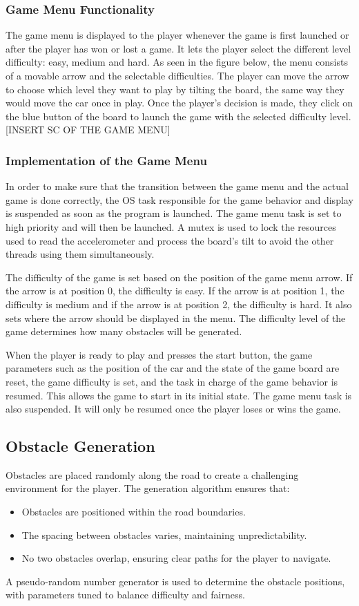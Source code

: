 \documentclass[conference]{IEEEtran}
\begin{document}
\subsubsection{Game Menu Functionality}
The game menu is displayed to the player whenever the game is first launched or after the player has won or lost a game. It lets the player select the different level difficulty: easy, medium and hard. As seen in the figure below, the menu consists of a movable arrow and the selectable difficulties. The player can move the arrow to choose which level they want to play by tilting the board, the same way they would move the car once in play. Once the player's decision is made, they click on the blue button of the board to launch the game with the selected difficulty level. 
[INSERT SC OF THE GAME MENU]

\subsubsection{Implementation of the Game Menu}
In order to make sure that the transition between the game menu and the actual game is done correctly, the OS task responsible for the game behavior and display is suspended as soon as the program is launched. The game menu task is set to high priority and will then be launched. A mutex is used to lock the resources used to read the accelerometer and process the board's tilt to avoid the other threads using them simultaneously. 

The difficulty of the game is set based on the position of the game menu arrow. If the arrow is at position 0, the difficulty is easy. If the arrow is at position 1, the difficulty is medium and if the arrow is at position 2, the difficulty is hard. It also sets where the arrow should be displayed in the menu. The difficulty level of the game determines how many obstacles will be generated.

When the player is ready to play and presses the start button, the game parameters such as the position of the car and the state of the game board are reset, the game difficulty is set, and the task in charge of the game behavior is resumed. This allows the game to start in its initial state. The game menu task is also suspended. It will only be resumed once the player loses or wins the game.

\subsection{Obstacle Generation}
Obstacles are placed randomly along the road to create a challenging environment for the player. The generation algorithm ensures that:
\begin{itemize}
    \item Obstacles are positioned within the road boundaries.
    \item The spacing between obstacles varies, maintaining unpredictability.
    \item No two obstacles overlap, ensuring clear paths for the player to navigate.
\end{itemize}
A pseudo-random number generator is used to determine the obstacle positions, with parameters tuned to balance difficulty and fairness.
\end{document}
